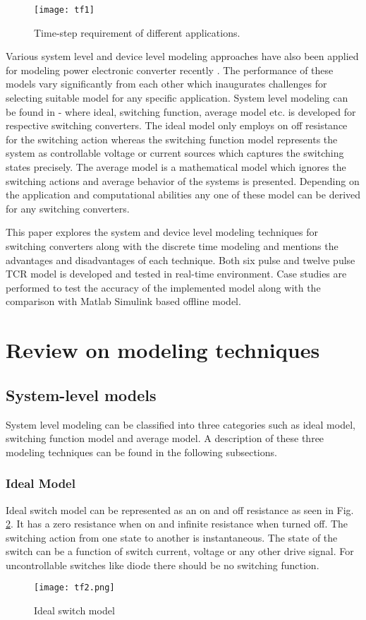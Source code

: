 \documentclass[journal]{IEEEtran}
\begin{document}
\begin{figure}[ht]
    \centering
    \texttt{[image: tf1]}
    \caption{Time-step requirement of different applications. \cite{belanger2010and}}
    \label{fig:T1}
\end{figure}

Various system level and device level modeling approaches have also been applied for modeling power electronic converter recently \cite{budihardjo1995defining}. The performance of these models vary significantly from each other which inaugurates challenges for selecting suitable model for any specific application. System level modeling can be found in \cite{jin1997behavior}-\cite{middlebrook1976general} where ideal, switching function, average model etc. is developed for respective switching converters. The ideal model only employs on off resistance for the switching action whereas the switching function model represents the system as controllable voltage or current sources which captures the switching states precisely. The average model is a mathematical model which ignores the switching actions and average behavior of the systems is presented. Depending on the application and computational abilities any one of these model can be derived for any switching converters.

This paper explores the system and device level modeling techniques for switching converters along with the discrete time modeling and mentions the advantages and disadvantages of each technique. Both six pulse and twelve pulse TCR model is developed and tested in real-time environment. Case studies are performed to test the accuracy of the implemented model along with the comparison with Matlab Simulink based offline model.

\section{Review on modeling techniques}

\subsection{System-level models}
System level modeling can be classified into three categories such as ideal model, switching function model and average model. A description of these three modeling techniques can be found in the following subsections.


\subsubsection{Ideal Model}
Ideal switch model can be represented as an on and off resistance as seen in Fig. \ref{fig:T2}. It has a zero resistance when on and infinite resistance when turned off. The switching action from one state to another is instantaneous. The state of the switch can be a function of switch current, voltage or any other drive signal. For uncontrollable switches like diode there should be no switching function.
\begin{figure}[ht]
    \centering
    \texttt{[image: tf2.png]}
    \caption{Ideal switch model}
    \label{fig:T2}
\end{figure}
\end{document}
